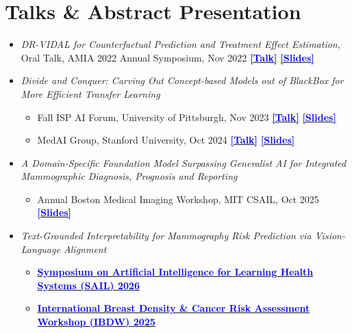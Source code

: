 \section{Talks \& Abstract Presentation}
\begin{itemize}[itemsep=0pt, parsep=0pt]
    \item {\textit{DR-VIDAL for Counterfactual Prediction and Treatment Effect Estimation}, Oral Talk, AMIA 2022 Annual Symposium, Nov 2022} 
    \href{https://www.youtube.com/watch?v=BB5fLYxBFV4}{\textbf{\textcolor{blue}{[Talk]}}}
    \href{https://docs.google.com/presentation/d/1oQA4m0oVeNmjBc6t7al1Is1evB-uVg7F/edit?pli=1#slide=id.p1}{\textbf{\textcolor{blue}{[Slides]}}}
    
    \item{\textit{Divide and Conquer: Carving Out Concept-based Models out of BlackBox for More Efficient Transfer Learning}}
    \begin{itemize}[itemsep=0pt, parsep=0pt]
        \item Fall ISP AI Forum, University of Pittsburgh, Nov 2023 
        \href{https://www.youtube.com/watch?v=sXzh5cIeJD8}{\textbf{\textcolor{blue}{[Talk]}}}
        \href{https://drive.google.com/file/d/1ThkYxSxX1GLhLNKuQLtEmtv9fZxaPsAM/view}{\textbf{\textcolor{blue}{[Slides]}}}
        
        \item MedAI Group, Stanford University, Oct 2024 
        \href{https://www.youtube.com/watch?v=WvodsOL6NFU}{\textbf{\textcolor{blue}{[Talk]}}}
        \href{https://drive.google.com/file/d/1fcyqTtkHooYRCyclmUOznxLlad5fyKCm/view?usp=sharing}{\textbf{\textcolor{blue}{[Slides]}}}
    \end{itemize}

    \item {\textit{A Domain-Specific Foundation Model Surpassing Generalist AI for Integrated Mammographic Diagnosis, Prognosis and Reporting}}
    \begin{itemize}[itemsep=0pt, parsep=0pt]
        \item Annual Boston Medical Imaging Workshop, MIT CSAIL, Oct 2025 
        \href{https://drive.google.com/file/d/1yQUrmSCdt_bFkdURMnHa2Q9TDwjPD5bH/view?usp=drive_link}{\textbf{\textcolor{blue}{[Slides]}}}
    \end{itemize}
    
    \item {\textit{Text-Grounded Interpretability for Mammography Risk Prediction via Vision-Language Alignment}}
    \begin{itemize}[itemsep=0pt, parsep=0pt]
        \item \href{https://sail.health/event/sail-2026/program/}{\textbf{\textcolor{blue}{Symposium on Artificial Intelligence
                        for Learning Health Systems (SAIL) 2026}}} 
        \item \href{https://breastdensityworkshop.org/program/}{\textbf{\textcolor{blue}{ International Breast Density \& Cancer Risk Assessment Workshop (IBDW) 2025}}} 
    \end{itemize}
\end{itemize}
